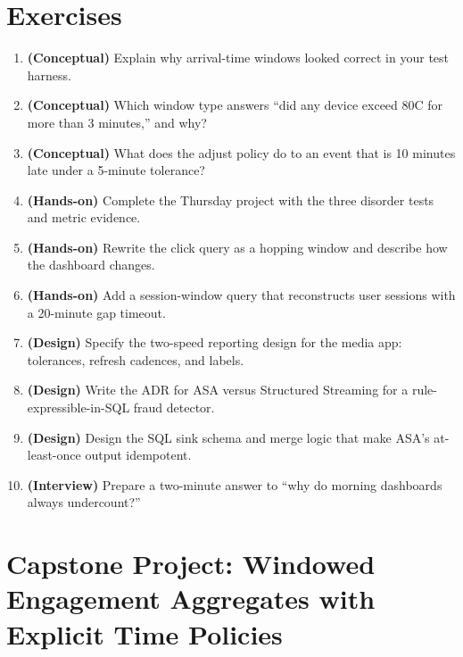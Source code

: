 \section{Exercises}
\begin{enumerate}
    \item \textbf{(Conceptual)} Explain why arrival-time windows looked correct in your test harness.
    \item \textbf{(Conceptual)} Which window type answers ``did any device exceed 80\textdegree C for more than 3 minutes,'' and why?
    \item \textbf{(Conceptual)} What does the adjust policy do to an event that is 10 minutes late under a 5-minute tolerance?
    \item \textbf{(Hands-on)} Complete the Thursday project with the three disorder tests and metric evidence.
    \item \textbf{(Hands-on)} Rewrite the click query as a hopping window and describe how the dashboard changes.
    \item \textbf{(Hands-on)} Add a session-window query that reconstructs user sessions with a 20-minute gap timeout.
    \item \textbf{(Design)} Specify the two-speed reporting design for the media app: tolerances, refresh cadences, and labels.
    \item \textbf{(Design)} Write the ADR for ASA versus Structured Streaming for a rule-expressible-in-SQL fraud detector.
    \item \textbf{(Design)} Design the SQL sink schema and merge logic that make ASA's at-least-once output idempotent.
    \item \textbf{(Interview)} Prepare a two-minute answer to ``why do morning dashboards always undercount?''
\end{enumerate}

\section{Capstone Project: Windowed Engagement Aggregates with Explicit Time Policies}\label{sec:ch14-capstone}

